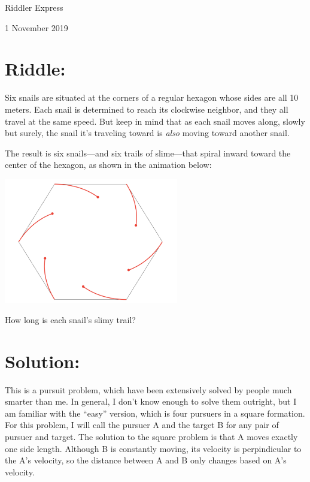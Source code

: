 \documentclass{article}
\begin{document}
\pagestyle{empty} %

\begin{center}
{\LARGE Riddler Express}

\vspace{0.15in}

{\Large 1 November 2019}
\end{center}


\section*{Riddle:}

Six snails are situated at the corners of a regular hexagon whose sides are all 10 meters.
Each snail is determined to reach its clockwise neighbor, and they all travel at the same speed.
But keep in mind that as each snail moves along, slowly but surely, the snail it’s traveling toward is \textit{also} moving toward another snail.

The result is six snails---and six trails of slime---that spiral inward toward the center of the hexagon, as shown in the animation below:

\begin{center}
\includegraphics[width=3in]{hexagon1.png}
\end{center}

How long is each snail’s slimy trail?


\section*{Solution:}

This is a pursuit problem, which have been extensively solved by people much smarter than me.
In general, I don't know enough to solve them outright, but I am familiar with the ``easy'' version, which is four pursuers in a square formation.
For this problem, I will call the pursuer A and the target B for any pair of pursuer and target.
The solution to the square problem is that A moves exactly one side length.
Although B is constantly moving, its velocity is perpindicular to the A's velocity, so the distance between A and B only changes based on A's velocity.
\end{document}
